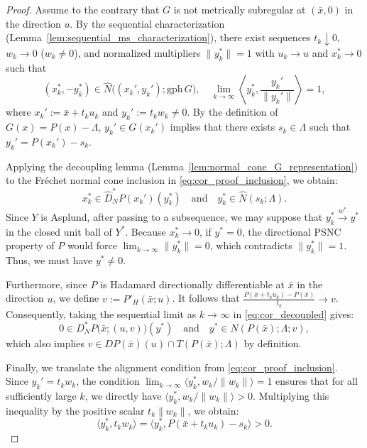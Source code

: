 \documentclass[10pt,a4paper]{amsart}
\begin{document}
\begin{proof}
    Assume to the contrary that $G$ is not metrically subregular at $(\bar{x}, 0)$ in the direction $u$. By the sequential characterization (Lemma~\ref{lem:sequential_ms_characterization}), there exist sequences $t_k \downarrow 0$, $w_k \to 0$ ($w_k \neq 0$), and normalized multipliers $\|y_k^*\| = 1$ with $u_k \to u$ and $x_k^* \to 0$ such that
    \begin{equation} \label{eq:cor_proof_inclusion}
        (x_k^*, -y_k^*) \in \widehat{N}\big((x_k', y_k'); \mathrm{gph}\, G\big), \quad \lim_{k\to \infty} \left\langle y_k^*, \frac{y_k'}{\|y_k'\|} \right\rangle = 1,
    \end{equation}
    where $x_k' := \bar{x} + t_k u_k$ and $y_k' := t_k w_k \neq 0$. By the definition of $G(x) = P(x) - \Lambda$, $y_k' \in G(x_k')$ implies that there exists $s_k \in \Lambda$ such that $y_k' = P(x_k') - s_k$.

    Applying the decoupling lemma (Lemma~\ref{lem:normal_cone_G_representation}) to the Fr\'echet normal cone inclusion in \eqref{eq:cor_proof_inclusion}, we obtain:
    \begin{equation} \label{eq:cor_decoupled}
        x_k^* \in \widehat{D}_N^* P(x_k')(y_k^*) \quad \text{and} \quad y_k^* \in \widehat{N}(s_k; \Lambda).
    \end{equation}
    Since $Y$ is Asplund, after passing to a subsequence, we may suppose that $y_k^* \xrightarrow{w^*} y^*$ in the closed unit ball of $Y^*$. Because $x_k^* \to 0$, if $y^* = 0$, the directional PSNC property of $P$ would force $\lim_{k \to \infty} \|y_k^*\| = 0$, which contradicts $\|y_k^*\| = 1$. Thus, we must have $y^* \neq 0$. 

    Furthermore, since $P$ is Hadamard directionally differentiable at $\bar{x}$ in the direction $u$, we define $v := P'_H(\bar{x}; u)$. It follows that $\frac{P(\bar{x} + t_k u_k) - P(\bar{x})}{t_k} \to v$. Consequently, taking the sequential limit as $k \to \infty$ in \eqref{eq:cor_decoupled} gives:
    \begin{equation*}
        0 \in D_N^* P\big(\bar{x}; (u, v)\big)(y^*) \quad \text{and} \quad y^* \in N(P(\bar{x}); \Lambda; v),
    \end{equation*}
    which also implies $v \in DP(\bar{x})(u) \cap T(P(\bar{x}); \Lambda)$ by definition.

    Finally, we translate the alignment condition from \eqref{eq:cor_proof_inclusion}. Since $y_k' = t_k w_k$, the condition $\lim_{k \to \infty} \langle y_k^*, w_k/\|w_k\| \rangle = 1$ ensures that for all sufficiently large $k$, we directly have $\langle y_k^*, w_k/\|w_k\| \rangle > 0$. Multiplying this inequality by the positive scalar $t_k \|w_k\|$, we obtain:
    \begin{equation*}
        \langle y_k^*, t_k w_k \rangle = \langle y_k^*, P(\bar{x} + t_k u_k) - s_k \rangle > 0.
    \end{equation*}


\end{proof}
\end{document}
